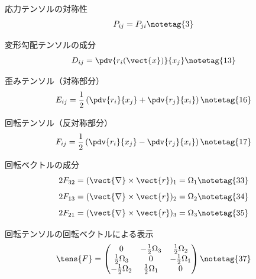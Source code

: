 \documentclass[uplatex,dvipdfmx,a4paper,11pt]{jsarticle}
\begin{document}
\begin{kirokuichiran}
\end{kirokuichiran}

\youtenseiri
\begin{noteshikilist}
  \item 応力テンソルの対称性 %
    \[ P_{ij}=P_{ji} \notetag{3} \]
  \item 変形勾配テンソルの成分 %
    \[ D_{ij}=\pdv{r_i(\vect{x})}{x_j} \notetag{13} \]
  \item 歪みテンソル（対称部分） %
    \[ E_{ij}=\frac{1}{2}\left(\pdv{r_i}{x_j}+\pdv{r_j}{x_i}\right) \notetag{16} \]
  \item 回転テンソル（反対称部分） %
    \[ F_{ij}=\frac{1}{2}\left(\pdv{r_i}{x_j}-\pdv{r_j}{x_i}\right) \notetag{17} \]
  \item 回転ベクトルの成分 %
    \[ 2F_{32}=(\vect{\nabla}\times\vect{r})_1=\Omega_1 \notetag{33} \]
    \[ 2F_{13}=(\vect{\nabla}\times\vect{r})_2=\Omega_2 \notetag{34} \]
    \[ 2F_{21}=(\vect{\nabla}\times\vect{r})_3=\Omega_3 \notetag{35} \]
  \item 回転テンソルの回転ベクトルによる表示 %
    \[ \tens{F}=\begin{pmatrix} 0 & -\frac{1}{2}\Omega_3 & \frac{1}{2}\Omega_2\\ \frac{1}{2}\Omega_3 & 0 & -\frac{1}{2}\Omega_1\\ -\frac{1}{2}\Omega_2 & \frac{1}{2}\Omega_1 & 0 \end{pmatrix} \notetag{37} \]
\end{noteshikilist}
\end{document}
